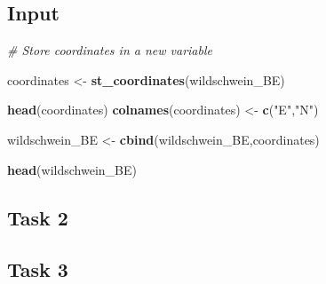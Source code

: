 \documentclass[]{book}
\newenvironment{Shaded}{\begin{snugshade}}{\end{snugshade}}
\newcommand{\KeywordTok}[1]{\textcolor[rgb]{0.13,0.29,0.53}{\textbf{#1}}}
\newcommand{\DataTypeTok}[1]{\textcolor[rgb]{0.13,0.29,0.53}{#1}}
\newcommand{\DecValTok}[1]{\textcolor[rgb]{0.00,0.00,0.81}{#1}}
\newcommand{\StringTok}[1]{\textcolor[rgb]{0.31,0.60,0.02}{#1}}
\newcommand{\CommentTok}[1]{\textcolor[rgb]{0.56,0.35,0.01}{\textit{#1}}}
\newcommand{\OperatorTok}[1]{\textcolor[rgb]{0.81,0.36,0.00}{\textbf{#1}}}
\newcommand{\NormalTok}[1]{#1}
\begin{document}
\subsection{Input}\label{input-3}

\begin{Shaded}
\begin{Highlighting}[]
\CommentTok{# Store coordinates in a new variable}

\NormalTok{coordinates <-}\StringTok{ }\KeywordTok{st_coordinates}\NormalTok{(wildschwein_BE)}

\KeywordTok{head}\NormalTok{(coordinates)}
\KeywordTok{colnames}\NormalTok{(coordinates) <-}\StringTok{ }\KeywordTok{c}\NormalTok{(}\StringTok{"E"}\NormalTok{,}\StringTok{"N"}\NormalTok{)}

\NormalTok{wildschwein_BE <-}\StringTok{ }\KeywordTok{cbind}\NormalTok{(wildschwein_BE,coordinates)}

\KeywordTok{head}\NormalTok{(wildschwein_BE)}
\end{Highlighting}
\end{Shaded}

\subsection{Task 2}\label{task-2-1}

\begin{Shaded}
\end{Shaded}

\subsection{Task 3}\label{task-3-1}
\end{document}
